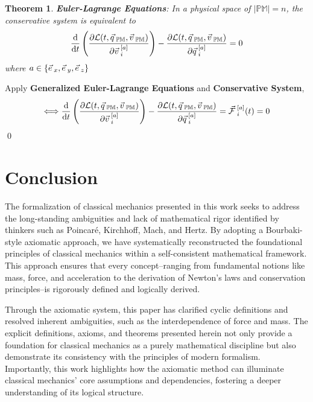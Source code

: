 \documentclass[12pt]{amsart}
\newtheorem{theorem}{Theorem}[section]
\renewenvironment{proof}{{\bfseries Proof.}}{\qed}
\let\oldvec\vec
\renewcommand{\vec}[1]{\oldvec{#1}\hspace{0.1em}}
\begin{document}
\begin{theorem}
    \textbf{Euler-Lagrange Equations}: In a physical space of $\left | \mathbb{PM} \right | = n$, the conservative system is equivalent to 
    $$
    \dfrac{\mathrm{d}}{\mathrm{d}  t} \left ( \dfrac{\partial \mathcal{L} (t, \vec{q}_\mathbb{PM}, \vec{v}_\mathbb{PM})}{\partial \vec{v}^{[a]}_i}  \right ) - \dfrac{\partial \mathcal{L} (t, \vec{q}_\mathbb{PM}, \vec{v}_\mathbb{PM})}{\partial \vec{q}^{[a]}_i} = 0
    $$
    where $a \in \{ \vec{e}_x, \vec{e}_y, \vec{e}_z \}$
\end{theorem}

\begin{proof}
    Apply \textbf{Generalized Euler-Lagrange Equations} and \textbf{Conservative System},
    $$\Longleftrightarrow \dfrac{\mathrm{d}}{\mathrm{d}  t} \left ( \dfrac{\partial \mathcal{L} (t, \vec{q}_\mathbb{PM}, \vec{v}_\mathbb{PM})}{\partial \vec{v}^{[a]}_i}  \right ) - \dfrac{\partial \mathcal{L} (t, \vec{q}_\mathbb{PM}, \vec{v}_\mathbb{PM})}{\partial \vec{q}^{[a]}_i } = \vec{\mathcal{F}}^{[a]}_i (t) = 0$$
\end{proof}



\newpage

\section{Conclusion}

The formalization of classical mechanics presented in this work seeks to address the long-standing ambiguities and lack of mathematical rigor identified by thinkers such as Poincaré, Kirchhoff, Mach, and Hertz. By adopting a Bourbaki-style axiomatic approach, we have systematically reconstructed the foundational principles of classical mechanics within a self-consistent mathematical framework. This approach ensures that every concept--ranging from fundamental notions like mass, force, and acceleration to the derivation of Newton's laws and conservation principles--is rigorously defined and logically derived.

Through the axiomatic system, this paper has clarified cyclic definitions and resolved inherent ambiguities, such as the interdependence of force and mass. The explicit definitions, axioms, and theorems presented herein not only provide a foundation for classical mechanics as a purely mathematical discipline but also demonstrate its consistency with the principles of modern formalism. Importantly, this work highlights how the axiomatic method can illuminate classical mechanics' core assumptions and dependencies, fostering a deeper understanding of its logical structure.
\end{document}

